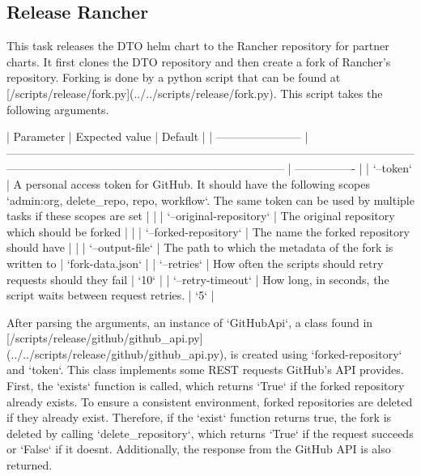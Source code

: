 \subsection{Release Rancher}\label{subsec:release-rancher}

This task releases the DTO helm chart to the Rancher repository for partner charts.
It first clones the DTO repository and then create a fork of Rancher's repository.
Forking is done by a python script that can be found at [/scripts/release/fork.py](../../scripts/release/fork.py).
This script takes the following arguments.

| Parameter               | Expected value                                                                                                                                                                         | Default          |
| ----------------------- | -------------------------------------------------------------------------------------------------------------------------------------------------------------------------------------- | ---------------- |
| `--token`               | A personal access token for GitHub. It should have the following scopes `admin:org, delete_repo, repo, workflow`. The same token can be used by multiple tasks if these scopes are set |                  |
| `--original-repository` | The original repository which should be forked                                                                                                                                         |                  |
| `--forked-repository`   | The name the forked repository should have                                                                                                                                             |                  |
| `--output-file`         | The path to which the metadata of the fork is written to                                                                                                                               | `fork-data.json` |
| `--retries`             | How often the scripts should retry requests should they fail                                                                                                                           | `10`             |
| `--retry-timeout`       | How long, in seconds, the script waits between request retries.                                                                                                                        | `5`              |

After parsing the arguments, an instance of `GitHubApi`, a class found in [/scripts/release/github/github_api.py](../../scripts/release/github/github_api.py), is created using `{forked-repository}` and `{token}`.
This class implements some REST requests GitHub's API provides.
First, the `exists` function is called, which returns `True` if the forked repository already exists.
To ensure a consistent environment, forked repositories are deleted if they already exist.
Therefore, if the `exist` function returns true, the fork is deleted by calling `delete_repository`, which returns `True` if the request succeeds or `False` if it doesnt.
Additionally, the response from the GitHub API is also returned.

